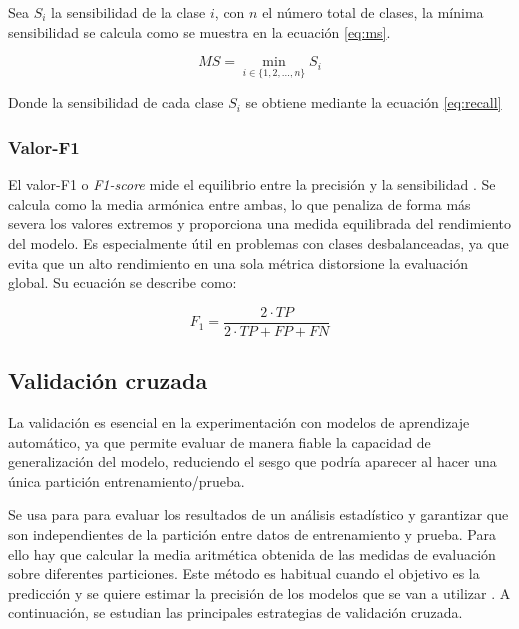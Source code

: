 \vspace{1em}

Sea \( S_i \) la sensibilidad de la clase \( i \), con \( n \) el número total de clases, la mínima sensibilidad se calcula como se muestra en la ecuación \ref{eq:ms}.

\begin{equation}
	MS = \min_{i \in \{1, 2, \dots, n\}} S_i
	\label{eq:ms}
\end{equation}

Donde la sensibilidad de cada clase \( S_i \) se obtiene mediante la ecuación \ref{eq:recall}

\subsubsection{Valor-F1}
\label{subsubsec:f1}

El valor-F1 o \textit{F1-score} mide el equilibrio entre la precisión y la sensibilidad \cite{metrics}. Se calcula como la media armónica entre ambas, lo que penaliza de forma más severa los valores extremos y proporciona una medida equilibrada del rendimiento del modelo. Es especialmente útil en problemas con clases desbalanceadas, ya que evita que un alto rendimiento en una sola métrica distorsione la evaluación global. Su ecuación se describe como:

\begin{equation}
F_1 = \frac{2 \cdot TP}{2 \cdot TP + FP + FN}
\end{equation}

\subsection{Validación cruzada}
\label{subsec:validacion}

La validación es esencial en la experimentación con modelos de aprendizaje automático, ya que permite evaluar de manera fiable la capacidad de generalización del modelo, reduciendo el sesgo que podría aparecer al hacer una única partición entrenamiento/prueba.

\vspace{1em}

Se usa para para evaluar los resultados de un análisis estadístico y garantizar que son independientes de la partición entre datos de entrenamiento y prueba. Para ello hay que calcular la media aritmética obtenida de las medidas de evaluación sobre diferentes particiones. Este método es habitual cuando el objetivo es la predicción y se quiere estimar la precisión de los modelos que se van a utilizar \cite{crossval}. A continuación, se estudian las principales estrategias de validación cruzada.

